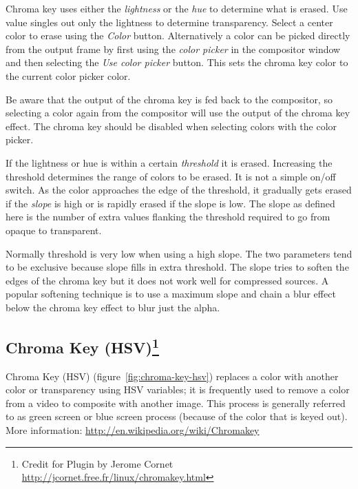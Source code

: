 Chroma key uses either the \textit{lightness} or the \textit{hue} to determine what is erased. Use value singles out only the lightness to determine transparency.
Select a center color to erase using the \textit{Color} button. Alternatively a color can be picked directly from the output frame by first using the \textit{color picker} in the compositor window and then selecting the \textit{Use color picker} button. This sets the chroma key color to the current color picker color.

Be aware that the output of the chroma key is fed back to the compositor, so selecting a color again from the compositor will use the output of the chroma key effect. The chroma key should be disabled when selecting colors with the color picker.

If the lightness or hue is within a certain \textit{threshold} it is erased. Increasing the threshold determines the range of colors to be erased. It is not a simple on/off switch. As the color approaches the edge of the threshold, it gradually gets erased if the \textit{slope} is high or is rapidly erased if the slope is low. The slope as defined here is the number of extra values flanking the threshold required to go from opaque to transparent.

Normally threshold is very low when using a high slope. The two parameters tend to be exclusive because slope fills in extra threshold. The slope tries to soften the edges of the chroma key but it does not work well for compressed sources. A popular softening technique is to use a maximum slope and chain a blur effect below the chroma key effect to blur just the alpha.

\subsection[Chroma Key (HSV)]{Chroma Key (HSV)\protect\footnote{Credit for Plugin by Jerome Cornet \url{http://jcornet.free.fr/linux/chromakey.html}}}%
\label{sub:chroma_key_hsv}

Chroma Key (HSV) (figure~\ref{fig:chroma-key-hsv}) replaces a color with another color or transparency using HSV variables; it is frequently used to remove a color from a video to composite with another image. This process is generally referred to as green screen or blue screen process (because of the color that is keyed out). More information: {\small \url{http://en.wikipedia.org/wiki/Chromakey}}


